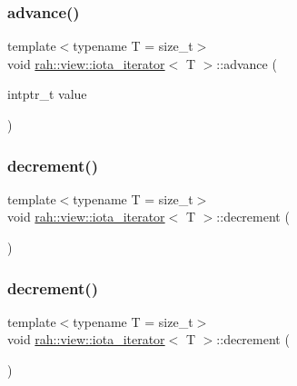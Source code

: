 \subsubsection{\texorpdfstring{advance()}{advance()}\hspace{0.1cm}{\footnotesize\ttfamily [2/2]}}
{\footnotesize\ttfamily template$<$typename T  = size\+\_\+t$>$ \\
void \mbox{\hyperlink{structrah_1_1view_1_1iota__iterator}{rah\+::view\+::iota\+\_\+iterator}}$<$ T $>$\+::advance (\begin{DoxyParamCaption}\item[{intptr\+\_\+t}]{value }\end{DoxyParamCaption})\hspace{0.3cm}{\ttfamily [inline]}}

\mbox{\label{structrah_1_1view_1_1iota__iterator_ab11421ab7ec8d986bdf7ef5f930d0b43}} 
\subsubsection{\texorpdfstring{decrement()}{decrement()}\hspace{0.1cm}{\footnotesize\ttfamily [1/2]}}
{\footnotesize\ttfamily template$<$typename T  = size\+\_\+t$>$ \\
void \mbox{\hyperlink{structrah_1_1view_1_1iota__iterator}{rah\+::view\+::iota\+\_\+iterator}}$<$ T $>$\+::decrement (\begin{DoxyParamCaption}{ }\end{DoxyParamCaption})\hspace{0.3cm}{\ttfamily [inline]}}

\mbox{\label{structrah_1_1view_1_1iota__iterator_ab11421ab7ec8d986bdf7ef5f930d0b43}} 
\subsubsection{\texorpdfstring{decrement()}{decrement()}\hspace{0.1cm}{\footnotesize\ttfamily [2/2]}}
{\footnotesize\ttfamily template$<$typename T  = size\+\_\+t$>$ \\
void \mbox{\hyperlink{structrah_1_1view_1_1iota__iterator}{rah\+::view\+::iota\+\_\+iterator}}$<$ T $>$\+::decrement (\begin{DoxyParamCaption}{ }\end{DoxyParamCaption})\hspace{0.3cm}{\ttfamily [inline]}}

